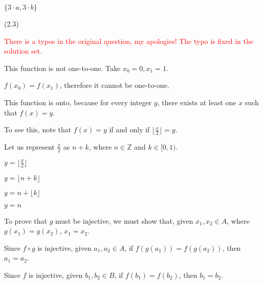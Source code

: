 \documentclass{exam}
\begin{document}
\begin{questions}
\begin{subparts}

\begin{center}
\( \{3 \cdot a, 3 \cdot b\} \)
\end{center}

\end{subparts}

 (2.3)

\begin{center}

\textcolor{red}{There is a typos in the original question, my apologies! The typo is fixed in the solution set.}

This function is not one-to-one. Take \(x_0 = 0, x_1 = 1\). 

\(f(x_0) = f(x_1)\), therefore it cannot be one-to-one.
\vspace{5px}

This function is onto, because for every integer \(y\), there exists at least one \(x\) such that \(f(x) = y\). 

To see this, note that \(f(x) = y\) if and only if \(\lfloor \frac{x}{2} \rfloor = y\).

Let us represent \(\frac{x}{2}\) as \(n + k\), where \(n \in \mathbb{Z}\) and \(k \in [0,1)\). 

\( y = \lfloor \frac{x}{2} \rfloor \)

\( y = \lfloor n + k \rfloor \)

\( y = n + \lfloor k \rfloor \)

\( y = n \)

\end{center}

\newpage

\begin{subparts}

\begin{center}

To prove that \(g\) must be injective, we must show that, given \(x_1, x_2 \in A\), where \(g(x_1) = g(x_2)\), \(x_1 = x_2\).

Since \(f \circ g\) is injective, given \(a_1, a_2 \in A\), if \(f(g(a_1)) = f(g(a_2))\), then \(a_1 = a_2\).

Since \(f\) is injective, given \(b_1, b_2 \in B\), if \(f(b_1) = f(b_2)\), then \(b_1 = b_2\).


\end{center}
\end{subparts}
\end{questions}
\end{document}
